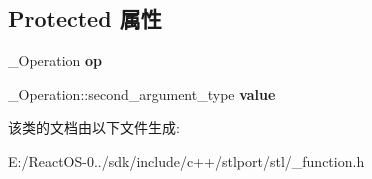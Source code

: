 \subsection*{Protected 属性}
\begin{DoxyCompactItemize}
\item 
\mbox{\label{classbinder2nd_a22490570196c1c05b0b0de9491ac0e4b}} 
\+\_\+\+Operation {\bfseries op}
\item 
\mbox{\label{classbinder2nd_af2e5867275f3c553b60db8f2bf4ff772}} 
\+\_\+\+Operation\+::second\+\_\+argument\+\_\+type {\bfseries value}
\end{DoxyCompactItemize}


该类的文档由以下文件生成\+:\begin{DoxyCompactItemize}
\item 
E\+:/\+React\+O\+S-\/0../sdk/include/c++/stlport/stl/\+\_\+function.\+h\end{DoxyCompactItemize}
